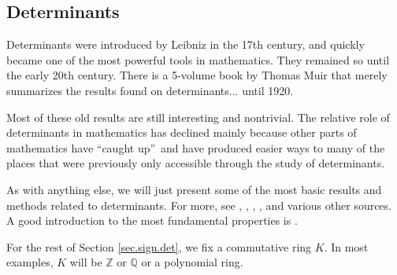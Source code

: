 \subsection{\label{sec.sign.det}Determinants}

Determinants were introduced by Leibniz in the 17th century, and quickly
became one of the most powerful tools in mathematics. They remained so until
the early 20th century. There is a 5-volume book by Thomas Muir \cite{Muir}
that merely summarizes the results found on determinants... until 1920.

Most of these old results are still interesting and nontrivial. The relative
role of determinants in mathematics has declined mainly because other parts of
mathematics have \textquotedblleft caught up\textquotedblright\ and have
produced easier ways to many of the places that were previously only
accessible through the study of determinants.

As with anything else, we will just present some of the most basic results and
methods related to determinants. For more, see \cite{MuiMet60}, \cite{Zeilbe},
\cite[Chapter 6]{detnotes}, \cite[Chapter I]{Prasolov}, \cite[Chapter
9]{BruRys91} and various other sources. A good introduction to the most
fundamental properties is \cite{Strick13}.

\begin{convention}
\label{conv.det.K}For the rest of Section \ref{sec.sign.det}, we fix a
commutative ring $K$. In most examples, $K$ will be $\mathbb{Z}$ or
$\mathbb{Q}$ or a polynomial ring.
\end{convention}

